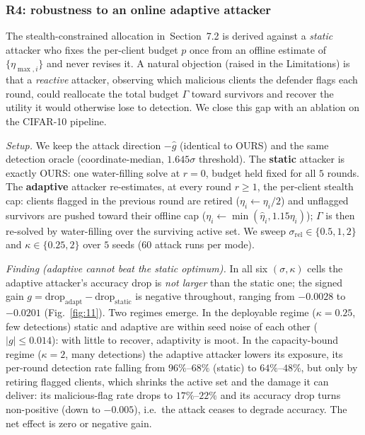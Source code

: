 \documentclass[final,1p,times]{elsarticle}
\begin{document}
\subsubsection{R4: robustness to an online adaptive attacker}
\label{sec:r4}

The stealth-constrained allocation in~Section~7.2 is derived against a
\emph{static} attacker who fixes the per-client budget $p$ once from an
offline estimate of $\{\eta_{\max,i}\}$ and never revises it. A natural
objection (raised in the Limitations) is that a \emph{reactive} attacker,
observing which malicious clients the defender flags each round, could
reallocate the total budget $\Gamma$ toward survivors and recover the
utility it would otherwise lose to detection. We close this gap with an
ablation on the CIFAR-10 pipeline.

\emph{Setup.} We keep the attack direction $-\hat g$ (identical to OURS)
and the same detection oracle (coordinate-median, $1.645\sigma$
threshold). The \textbf{static} attacker is exactly OURS: one
water-filling solve at $r{=}0$, budget held fixed for all $5$ rounds. The
\textbf{adaptive} attacker re-estimates, at every round $r{\ge}1$, the
per-client stealth cap: clients flagged in the previous round are retired
($\eta_i\!\leftarrow\!\eta_i/2$) and unflagged survivors are pushed toward
their offline cap ($\eta_i\!\leftarrow\!\min(\hat\eta_i,1.15\eta_i)$);
$\Gamma$ is then re-solved by water-filling over the surviving active set.
We sweep $\sigma_{\mathrm{rel}}\in\{0.5,1,2\}$ and
$\kappa\in\{0.25,2\}$ over $5$ seeds ($60$ attack runs per mode).

\emph{Finding (adaptive cannot beat the static optimum).} In all six
$(\sigma,\kappa)$ cells the adaptive attacker's accuracy drop is
\emph{not larger} than the static one; the signed gain
$g=\mathrm{drop}_{\mathrm{adapt}}-\mathrm{drop}_{\mathrm{static}}$ is
negative throughout, ranging from $-0.0028$ to $-0.0201$
(Fig.~\ref{fig:11}). Two regimes emerge. In the deployable regime
($\kappa{=}0.25$, few detections) static and adaptive are within seed
noise of each other ($|g|{\le}0.014$): with little to recover, adaptivity
is moot. In the capacity-bound regime ($\kappa{=}2$, many detections) the
adaptive attacker lowers its exposure, its per-round
detection rate falling from $96\%$--$68\%$ (static) to $64\%$--$48\%$,
but only by retiring flagged clients, which shrinks the active set and the
damage it can deliver: its malicious-flag rate drops to $17\%$--$22\%$ and
its accuracy drop turns non-positive (down to $-0.005$), i.e.\ the attack
ceases to degrade accuracy. The net effect is zero or negative gain.
\end{document}
